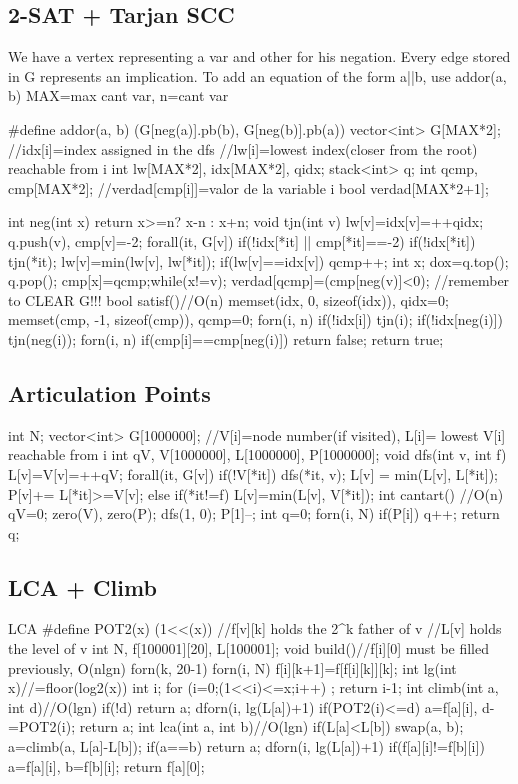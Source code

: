 \documentclass[10pt,landscape,twocolumn,a4paper,notitlepage]{article}
\begin{document}
\subsection{2-SAT + Tarjan SCC}
We have a vertex representing a var and other for his negation.
Every edge stored in G represents an implication. To add an equation of the form a||b, use addor(a, b)
MAX=max cant var, n=cant var
\begin{code}
#define addor(a, b) (G[neg(a)].pb(b), G[neg(b)].pb(a)) 
vector<int> G[MAX*2];
//idx[i]=index assigned in the dfs
//lw[i]=lowest index(closer from the root) reachable from i
int lw[MAX*2], idx[MAX*2], qidx;
stack<int> q;
int qcmp, cmp[MAX*2];
//verdad[cmp[i]]=valor de la variable i
bool verdad[MAX*2+1];

int neg(int x) { return x>=n? x-n : x+n;}
void tjn(int v){
	lw[v]=idx[v]=++qidx;
	q.push(v), cmp[v]=-2;
	forall(it, G[v]){
		if(!idx[*it] || cmp[*it]==-2){
			if(!idx[*it]) tjn(*it);
			lw[v]=min(lw[v], lw[*it]);
		}
	}
	if(lw[v]==idx[v]){
		qcmp++;
		int x;
		do{x=q.top(); q.pop(); cmp[x]=qcmp;}while(x!=v);
		verdad[qcmp]=(cmp[neg(v)]<0);
	}
}
//remember to CLEAR G!!!
bool satisf(){//O(n)
	memset(idx, 0, sizeof(idx)), qidx=0;
	memset(cmp, -1, sizeof(cmp)), qcmp=0;
	forn(i, n){
		if(!idx[i]) tjn(i);
		if(!idx[neg(i)]) tjn(neg(i));
	}
	forn(i, n) if(cmp[i]==cmp[neg(i)]) return false;
	return true;
}
\end{code}
\subsection{Articulation Points}
\begin{code}
int N;
vector<int> G[1000000];
//V[i]=node number(if visited), L[i]= lowest V[i] reachable from i
int qV, V[1000000], L[1000000], P[1000000];
void dfs(int v, int f){
	L[v]=V[v]=++qV;
	forall(it, G[v])
		if(!V[*it]){
			dfs(*it, v);
			L[v] = min(L[v], L[*it]);
			P[v]+= L[*it]>=V[v];
		}
		else if(*it!=f)
			L[v]=min(L[v], V[*it]);
}
int cantart(){ //O(n)
	qV=0;
	zero(V), zero(P);
	dfs(1, 0); P[1]--;
	int q=0;
	forn(i, N) if(P[i]) q++;
return q;
}
\end{code}
\subsection{LCA + Climb}
\begin{code}
LCA
#define POT2(x) (1<<(x))
//f[v][k] holds the 2^k father of v
//L[v] holds the level of v
int N, f[100001][20], L[100001];
void build(){//f[i][0] must be filled previously, O(nlgn)
	forn(k, 20-1) forn(i, N) f[i][k+1]=f[f[i][k]][k];}
int lg(int x){//=floor(log2(x))
	int i;
	for (i=0;(1<<i)<=x;i++) ;
	return i-1;
}
int climb(int a, int d){//O(lgn)
	if(!d) return a;
	dforn(i, lg(L[a])+1)
		if(POT2(i)<=d)
			a=f[a][i], d-=POT2(i);
    return a;
}
int lca(int a, int b){//O(lgn)
	if(L[a]<L[b]) swap(a, b);
	a=climb(a, L[a]-L[b]);
	if(a==b) return a;
	dforn(i, lg(L[a])+1)
		if(f[a][i]!=f[b][i])
			a=f[a][i], b=f[b][i];
	return f[a][0];
}
\end{code}
\end{document}

